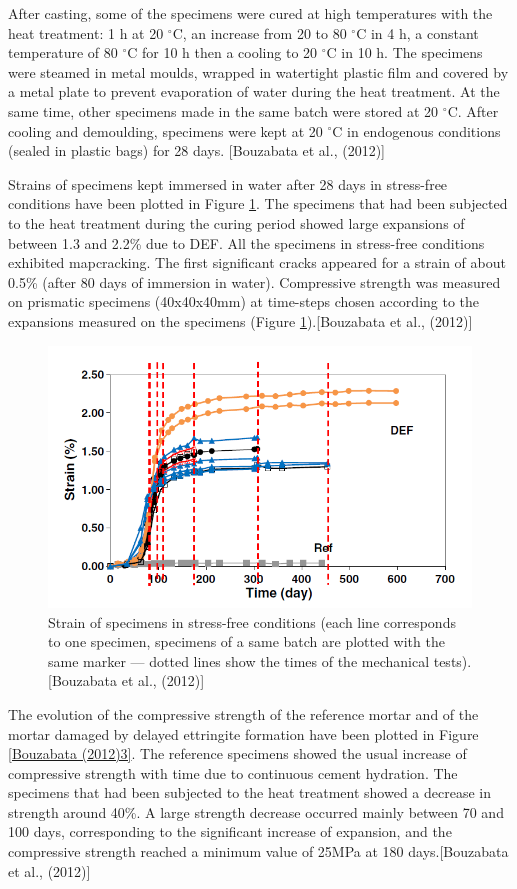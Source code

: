 After casting, some of the specimens were cured at high temperatures with the heat treatment: 1 h at 20 $^\circ$C, an increase from 20 to 80 $^\circ$C in 4 h, a constant temperature of 80 $^\circ$C for 10 h then a cooling to 20 $^\circ$C in 10 h. The specimens were steamed in metal moulds, wrapped in watertight plastic film and covered by a metal plate to prevent evaporation of water during the heat treatment. At the same time, other specimens made in the same batch were stored at 20 $^\circ$C. After cooling and demoulding, specimens were kept at 20 $^\circ$C in endogenous conditions (sealed in plastic bags) for 28 days. [Bouzabata et al., (2012)]

Strains of specimens kept immersed in water after 28 days in stress-free conditions have been plotted in Figure \ref{Bouzabata (2012)2}. The specimens that had been subjected to the heat treatment during the curing period showed large expansions of between 1.3 and 2.2\% due to DEF. All the specimens in stress-free conditions exhibited mapcracking. The first significant cracks appeared for a strain of about 0.5\% (after 80 days of immersion in water). Compressive strength was measured on prismatic specimens (40x40x40mm) at time-steps chosen according to the expansions measured on the specimens (Figure \ref{Bouzabata (2012)2}).[Bouzabata et al., (2012)]

\begin{figure}[h!]
  \centering
  \includegraphics[width=0.8\linewidth]{Reference/Bouzabata2.png}
  \caption{Strain of specimens in stress-free conditions (each line corresponds to one specimen, specimens of a same batch are plotted with the same marker — dotted lines show the times of the mechanical tests). [Bouzabata et al., (2012)]}
  \label{Bouzabata (2012)2}
\end{figure}

The evolution of the compressive strength of the reference mortar and of the mortar damaged by delayed ettringite formation have been plotted in Figure \ref{Bouzabata (2012)3}. The reference specimens showed the usual increase of compressive strength with time due to continuous cement hydration. The specimens that had been subjected to the heat treatment showed a decrease in strength around 40\%. A large strength decrease occurred mainly between 70 and 100 days, corresponding to the significant increase of expansion, and the compressive strength reached a minimum value of 25MPa at 180 days.[Bouzabata et al., (2012)]

